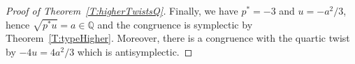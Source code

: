 \documentclass[12pt, reqno]{amsart}
\newcommand{\F}{\mathbb{F}}
\newcommand{\Q}{\mathbb{Q}}
\newcommand{\rhobar}{{\overline{\rho}}}
\newcommand{\eps}{\varepsilon}
\newcommand{\calO}{\mathcal{O}}
\DeclareMathOperator{\Gal}{Gal}
\newcommand{\diag}{{\operatorname{diag}}}
\numberwithin{equation}{section}
\theoremstyle{definition}
\theoremstyle{remark}
\newcommand{\jc}[1]{{\color{darkgreen} \textsf{[JC: #1]}}}
\begin{document}
\begin{proof}[Proof of Theorem~\ref{T:higherTwistsQ}]
\begin{comment}
$\Gal(F/\Q)=\left<\sigma,\tau\mid\sigma^4=\tau^2=1,
\tau\sigma\tau=\sigma^{-1}\right>$, so the fixed field of $\sigma$
is~$K'=\Q(i)$ and we may choose notation so that
$\sigma(\root4\of{u})=i\root4\of{u}$.  Then the cocycle~$\psi$
associated to (the quartic twist by) $u$ satisfies $\psi(\sigma)=i$, and
(with respect to the diagonal basis), $\Psi(\sigma)=\diag(j,-j)$.
Thus (in the notation of Lemma~\ref{L:DiagonalPsi}), $\eta(\sigma)=j$.

[If on the other hand we were to twist by $u^{-1}$, we would have
$\psi(\sigma)=-i$ and $\Psi(\sigma)=\diag(-j,j)$ with
$\eta(\sigma)=-j$.]


Next we need to identify $\sigma(P_1)$ (noting that the action of
$\sigma$ commutes with the $\calO$-action since the endomorphisms
of~$E_a$ are defined over~$K'$).  Since $\sigma(i)=i$ and
$\sigma(\sqrt{3})=-\sqrt{3}$, we compute that
\[
\sigma(x_1) = \frac{1-\sqrt{3}}{1-i}\left(i\root4\of u\right) =
-\frac{1-\sqrt{3}}{1+i}\root4\of{u} = -x_2 \notin\{\pm x_1\};
\]
hence $\sigma(P_1)=\pm[1\pm i]P_1$.  The outer sign is not
well-defined since $\sigma\in\Gal(F/\Q)$ while $P_1$ is not defined
over~$F$ but over a quadratic extension; but the $x$-coordinate of
$\sigma(P_1)$ is well-defined and this is all we will need.  Computing
$x(P_1\pm P_i)$ by the group law we find that $x(P_1-P_i)=-x_2$ (while
$x(P_1+P_i)=+x_2$), so $\sigma(P_1)=\pm[1-i]P_1$.  We may lift
$\sigma$ to $G_\Q$ in such a way that $\sigma(P_1)=[1-i]P_1$; any two
such lifts differ by a Galois automorphism which negates every element
of~$E_1[3]$, and this minus sign will cancel out.  (In the notation of
Lemma~\ref{L:diagonalC}, $c(\sigma)$ would be multiplied by $-1$ if we
made the other choice, while $\eps(\sigma)$ would be unchanged.)

Now $\sigma(Q_1) = \sigma([1-ji]P_1) = [1-ji]\sigma(P_1) =
[1-ji][1-i]P_1 = (1-j)[1-ji]P_1 = (1-j)Q_1$, and similarly,
$\sigma(Q_2)=(1+j)Q_2$.  So the matrix of $\rhobar_{E_a,3}(\sigma)$
with respect to the diagonal basis is
$\diag(1-j,1+j)=(1-j)\diag(1,j)$, so (in the notation of
Lemma~\ref{L:diagonalC}) we have $\eps(\sigma)=j$.

Hence the characters $\eps,\eta:\Gal(F/K')\to\F_9^*$ agree.
\jc{End of details.}
\end{comment}

Finally, we have $p^* = -3$ and $u=-a^2/3$, hence $\sqrt{p^*u} = a \in
\Q$ and the congruence is symplectic by Theorem~\ref{T:typeHigher}.
Moreover, there is a congruence with the quartic twist by $-4u=4a^2/3$
which is antisymplectic.


\end{proof}
\end{document}
